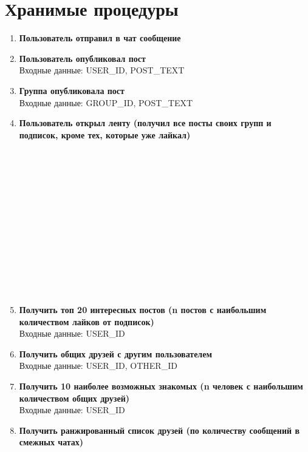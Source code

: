 \documentclass[12pt, a4paper] {ncc}
\begin{document}
\section{Хранимые процедуры}
\begin{enumerate}
\item \textbf{Пользователь отправил в чат сообщение} \\

\item \textbf{Пользователь опубликовал пост} \\
Входные данные: USER\_ID, POST\_TEXT

\item \textbf{Группа опубликовала пост} \\
Входные данные: GROUP\_ID, POST\_TEXT

\item \textbf{Пользователь открыл ленту (получил все посты своих групп и подписок, кроме тех, которые уже лайкал)} \\
\\\\\\\\\\\\\\\\\\\\\\\\\\

\item \textbf{Получить топ 20 интересных постов (n постов с наибольшим количеством лайков от подписок)} \\
Входные данные: USER\_ID

\item \textbf{Получить общих друзей с другим пользователем} \\
Входные данные: USER\_ID, OTHER\_ID

\item \textbf{Получить 10 наиболее возможных знакомых (n человек с наибольшим количеством общих друзей)} \\
Входные данные: USER\_ID \\

\item \textbf{Получить ранжированный список друзей (по количеству сообщений в смежных чатах)} \\

\end{enumerate}
\end{document}

